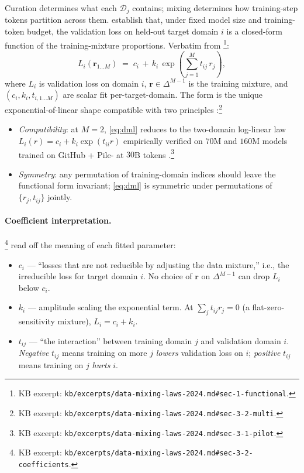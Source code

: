 Curation determines what each $\mathcal{D}_j$ contains; mixing
determines how training-step tokens partition across them.
\citet{data-mixing-laws-2024} establish that, under fixed model size
and training-token budget, the validation loss on held-out target
domain $i$ is a closed-form function of the training-mixture
proportions. Verbatim from
\citet[\S 1, eq.\ 1; \S 3.2, eq.\ 7]{data-mixing-laws-2024}\footnote{KB
excerpt: \texttt{kb/excerpts/data-mixing-laws-2024.md\#sec-1-functional}.}:
\begin{equation}
L_i(\mathbf{r}_{1\ldots M}) \;=\; c_i \,+\, k_i \,\exp\!\left(
   \sum_{j=1}^{M} t_{ij}\,r_j
\right),
\label{eq:dml}
\tag{1}
\end{equation}
where $L_i$ is validation loss on domain $i$, $\mathbf{r} \in
\Delta^{M-1}$ is the training mixture, and $(c_i, k_i, t_{i, 1\ldots
M})$ are scalar  fit per-target-domain. The form is the
unique exponential-of-linear shape compatible with two principles
\citep[\S 3.2]{data-mixing-laws-2024}:\footnote{KB excerpt:
\texttt{kb/excerpts/data-mixing-laws-2024.md\#sec-3-2-multi}.}

\begin{itemize}
\item \emph{Compatibility}: at $M = 2$, \cref{eq:dml} reduces to the
two-domain log-linear law $L_i(r) = c_i + k_i \exp(t_{ii} r)$
empirically verified on $70$M and $160$M models trained on
GitHub + Pile- at $30$B tokens
\citep[\S 3.1, eq.\ 6]{data-mixing-laws-2024}.\footnote{KB excerpt:
\texttt{kb/excerpts/data-mixing-laws-2024.md\#sec-3-1-pilot}.}
\item \emph{Symmetry}: any permutation of training-domain indices
should leave the functional form invariant; \cref{eq:dml} is
symmetric under permutations of $\{r_j, t_{ij}\}$ jointly.
\end{itemize}

\paragraph{Coefficient interpretation.}
\citet[\S 3.2]{data-mixing-laws-2024}\footnote{KB excerpt:
\texttt{kb/excerpts/data-mixing-laws-2024.md\#sec-3-2-coefficients}.}
read off the meaning of each fitted parameter:
\begin{itemize}
\item $c_i$ --- ``losses that are not reducible by adjusting the data
mixture,'' i.e., the irreducible loss for target domain $i$. No
choice of $\mathbf{r}$ on $\Delta^{M-1}$ can drop $L_i$ below $c_i$.
\item $k_i$ --- amplitude scaling the exponential term. At
$\sum_j t_{ij} r_j = 0$ (a flat-zero-sensitivity mixture), $L_i =
c_i + k_i$.
\item $t_{ij}$ --- ``the interaction'' between training domain $j$
and validation domain $i$. \emph{Negative} $t_{ij}$ means training
on more $j$ \emph{lowers} validation loss on $i$; \emph{positive}
$t_{ij}$ means training on $j$ \emph{hurts} $i$.
\end{itemize}

